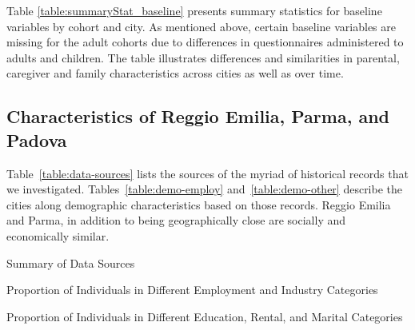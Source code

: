 Table \ref{table:summaryStat_baseline} presents summary statistics for baseline variables by cohort and city. As mentioned above, certain baseline variables are missing for the adult cohorts due to differences in questionnaires administered to adults and children. The table illustrates differences and similarities in parental, caregiver and family characteristics across cities as well as over time.

\begin{landscape}

\end{landscape}

\subsection{Characteristics of Reggio Emilia, Parma, and Padova}
\label{app:characteristics-cities}

Table~\ref{table:data-sources} lists the sources of the myriad of historical records that we investigated. Tables~\ref{table:demo-employ} and~\ref{table:demo-other} describe the cities along demographic characteristics based on those records. Reggio Emilia and Parma, in addition to being geographically close are socially and economically similar. 

\begin{table}[H]
\centering
	\caption{Summary of Data Sources} \label{table:data-sources}
	
\end{table}

\begin{landscape}
\begin{table}[ht!]
\begin{center}
\scriptsize{
	\caption{Proportion of Individuals in Different Employment and Industry Categories} \label{table:demo-employ}
	
}
\end{center}
\end{table}
\end{landscape}

\begin{landscape}
\begin{table}[ht!]
\begin{center}
\scriptsize{
	\caption{Proportion of Individuals in Different Education, Rental, and Marital Categories} \label{table:demo-other}
	
}
\end{center}
\end{table}
\end{landscape}




